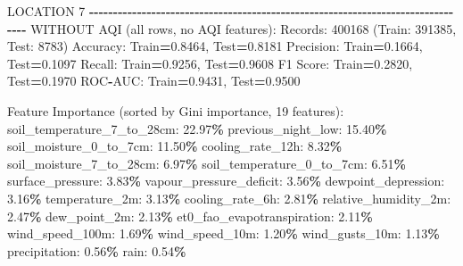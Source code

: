 \documentclass[
  letterpaper,
  DIV=11,
  numbers=noendperiod]{scrartcl}
\newenvironment{Shaded}{\begin{snugshade}}{\end{snugshade}}
\newcommand{\BuiltInTok}[1]{#1}
\newcommand{\DecValTok}[1]{\textcolor[rgb]{0.00,0.00,0.81}{#1}}
\newcommand{\FloatTok}[1]{\textcolor[rgb]{0.00,0.00,0.81}{#1}}
\newcommand{\NormalTok}[1]{#1}
\newcommand{\OperatorTok}[1]{\textcolor[rgb]{0.81,0.36,0.00}{\textbf{#1}}}
\begin{document}
\begin{Shaded}
\begin{Highlighting}[]
\NormalTok{LOCATION }\DecValTok{7}
\OperatorTok{{-}{-}{-}{-}{-}{-}{-}{-}{-}{-}{-}{-}{-}{-}{-}{-}{-}{-}{-}{-}{-}{-}{-}{-}{-}{-}{-}{-}{-}{-}{-}{-}{-}{-}{-}{-}{-}{-}{-}{-}{-}{-}{-}{-}{-}{-}{-}{-}{-}{-}{-}{-}{-}{-}{-}{-}{-}{-}{-}{-}{-}{-}{-}{-}{-}{-}{-}{-}{-}{-}{-}{-}{-}{-}{-}{-}{-}{-}{-}{-}}
\NormalTok{WITHOUT AQI (}\BuiltInTok{all}\NormalTok{ rows, no AQI features):}
\NormalTok{  Records: }\DecValTok{400168}\NormalTok{ (Train: }\DecValTok{391385}\NormalTok{, Test: }\DecValTok{8783}\NormalTok{)}
\NormalTok{  Accuracy: Train}\OperatorTok{=}\FloatTok{0.8464}\NormalTok{, Test}\OperatorTok{=}\FloatTok{0.8181}
\NormalTok{  Precision: Train}\OperatorTok{=}\FloatTok{0.1664}\NormalTok{, Test}\OperatorTok{=}\FloatTok{0.1097}
\NormalTok{  Recall: Train}\OperatorTok{=}\FloatTok{0.9256}\NormalTok{, Test}\OperatorTok{=}\FloatTok{0.9608}
\NormalTok{  F1 Score: Train}\OperatorTok{=}\FloatTok{0.2820}\NormalTok{, Test}\OperatorTok{=}\FloatTok{0.1970}
\NormalTok{  ROC}\OperatorTok{{-}}\NormalTok{AUC: Train}\OperatorTok{=}\FloatTok{0.9431}\NormalTok{, Test}\OperatorTok{=}\FloatTok{0.9500}

\NormalTok{  Feature Importance (}\BuiltInTok{sorted}\NormalTok{ by Gini importance, }\DecValTok{19}\NormalTok{ features):}
\NormalTok{    soil\_temperature\_7\_to\_28cm: }\FloatTok{22.97}\OperatorTok{\%}
\NormalTok{    previous\_night\_low: }\FloatTok{15.40}\OperatorTok{\%}
\NormalTok{    soil\_moisture\_0\_to\_7cm: }\FloatTok{11.50}\OperatorTok{\%}
\NormalTok{    cooling\_rate\_12h: }\FloatTok{8.32}\OperatorTok{\%}
\NormalTok{    soil\_moisture\_7\_to\_28cm: }\FloatTok{6.97}\OperatorTok{\%}
\NormalTok{    soil\_temperature\_0\_to\_7cm: }\FloatTok{6.51}\OperatorTok{\%}
\NormalTok{    surface\_pressure: }\FloatTok{3.83}\OperatorTok{\%}
\NormalTok{    vapour\_pressure\_deficit: }\FloatTok{3.56}\OperatorTok{\%}
\NormalTok{    dewpoint\_depression: }\FloatTok{3.16}\OperatorTok{\%}
\NormalTok{    temperature\_2m: }\FloatTok{3.13}\OperatorTok{\%}
\NormalTok{    cooling\_rate\_6h: }\FloatTok{2.81}\OperatorTok{\%}
\NormalTok{    relative\_humidity\_2m: }\FloatTok{2.47}\OperatorTok{\%}
\NormalTok{    dew\_point\_2m: }\FloatTok{2.13}\OperatorTok{\%}
\NormalTok{    et0\_fao\_evapotranspiration: }\FloatTok{2.11}\OperatorTok{\%}
\NormalTok{    wind\_speed\_100m: }\FloatTok{1.69}\OperatorTok{\%}
\NormalTok{    wind\_speed\_10m: }\FloatTok{1.20}\OperatorTok{\%}
\NormalTok{    wind\_gusts\_10m: }\FloatTok{1.13}\OperatorTok{\%}
\NormalTok{    precipitation: }\FloatTok{0.56}\OperatorTok{\%}
\NormalTok{    rain: }\FloatTok{0.54}\OperatorTok{\%}


\end{Highlighting}
\end{Shaded}
\end{document}
